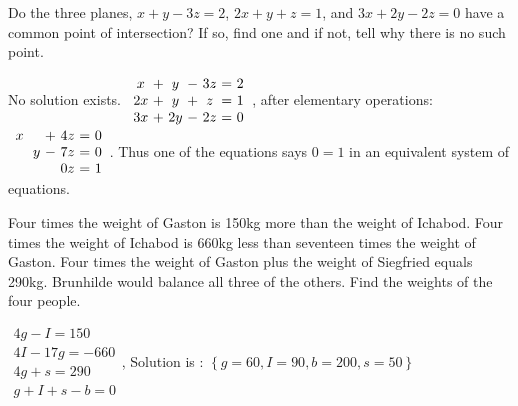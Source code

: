 \begin{enumialphparenastyle}
\begin{ex}
  Do the three planes, $x+y-3z=2$, $2x+y+z=1$, and $3x+2y-2z=0$ have a
  common point of intersection? If so, find one and if not, tell why
  there is no such point.
  \begin{sol}
    No solution exists. $
    \begin{array}{c@{~}c@{~}c@{~}c@{~}c@{~}c@{~}c}
      x &+& y &-& 3z &=& 2 \\
      2x &+& y &+& z &=& 1 \\
      3x &+& 2y &-& 2z &=& 0
    \end{array}
    $, after elementary operations: 
    $\begin{array}{c@{~}c@{~}c@{~}c@{~}c@{~}c@{~}c}
      x & &   &+& 4z &=& 0 \\
        & & y &-& 7z &=& 0 \\
        & &   & & 0z &=& 1
     \end{array}$.
    Thus one of the equations says $0=1$ in an equivalent system of
    equations.
  \end{sol}
\end{ex}


\begin{ex}
Four times the weight of Gaston is 150kg more than the weight of
Ichabod. Four times the weight of Ichabod is 660kg less than seventeen
times the weight of Gaston. Four times the weight of Gaston plus the weight
of Siegfried equals 290kg. Brunhilde would balance all three of the
others. Find the weights of the four people.
\begin{sol}
$\begin{array}{c}
4g-I=150 \\
4I-17g=-660 \\
4g+s=290 \\
g+I+s-b=0
\end{array}
$, Solution is : $\left\{ g=60,I=90,b=200,s=50\right\} $
\end{sol}
\end{ex}

\end{enumialphparenastyle}
